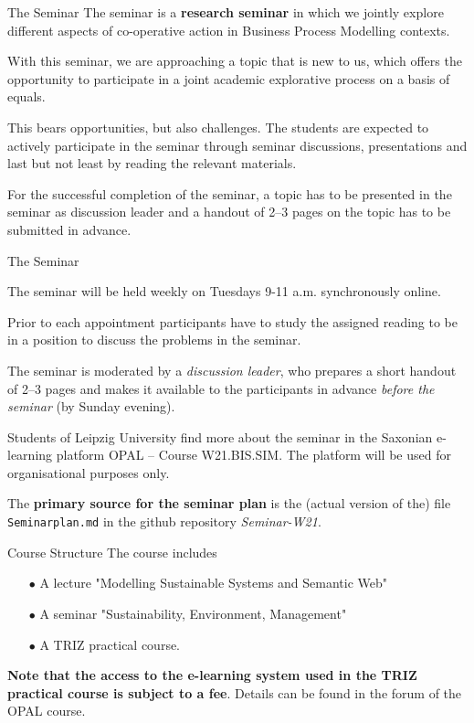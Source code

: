 \documentclass{beamer}
\begin{document}
\begin{frame}{The Seminar}
The seminar is a \textbf{research seminar} in which we jointly explore
different aspects of co-operative action in Business Process Modelling
contexts.

With this seminar, we are approaching a topic that is new to us, which offers
the opportunity to participate in a joint academic explorative process on a
basis of equals.

This bears opportunities, but also challenges.  The students are expected to
actively participate in the seminar through seminar discussions, presentations
and last but not least by reading the relevant materials.

For the successful completion of the seminar, a topic has to be presented in
the seminar as discussion leader and a handout of 2--3 pages on the topic has
to be submitted in advance.
\end{frame}

\begin{frame}{The Seminar}

The seminar will be held weekly on Tuesdays 9-11 a.m. synchronously online.

Prior to each appointment participants have to study the assigned reading to
be in a position to discuss the problems in the seminar.

The seminar is moderated by a \emph{discussion leader}, who prepares a short
handout of 2--3 pages and makes it available to the participants in advance
\emph{before the seminar} (by Sunday evening).

Students of Leipzig University find more about the seminar in the Saxonian
e-learning platform OPAL -- Course W21.BIS.SIM.  The platform will be used for
organisational purposes only.

The \textbf{primary source for the seminar plan} is the (actual version of
the) file \texttt{Seminarplan.md} in the github repository \emph{Seminar-W21}.
\end{frame}

\begin{frame}{Course Structure}
The course includes
\begin{itemize}
\item[$\bullet$] A lecture "Modelling Sustainable Systems and Semantic Web"
\item[$\bullet$] A seminar "Sustainability, Environment, Management"
\item[$\bullet$] A TRIZ practical course.
\end{itemize}
\textbf{Note that the access to the e-learning system used in the TRIZ
  practical course is subject to a fee}. Details can be found in the forum of
the OPAL course.
\end{frame}
\end{document}
